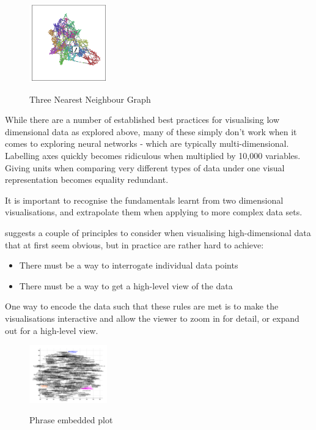 \documentclass[a4paper,11pt,titlepage]{article}
\begin{document}
		 		
 	\begin{figure}[H]
    			\centering	
			{{\includegraphics[width=0.3\textwidth]
    				{img/colah_nearest_neighbour.png} 
    			}}%
    			\caption{Three Nearest Neighbour Graph}%
    		\label{fig:3nn}
	\end{figure}	 	
 		

		While there are a number of established best practices for visualising low dimensional data as explored above, many of these simply don't work when it comes to exploring neural networks - which are typically multi-dimensional. Labelling axes quickly becomes ridiculous when multiplied by 10,000 variables. Giving units when comparing very different types of data under one visual representation becomes equality redundant.
		\par	 
		It is important to recognise the fundamentals learnt from two dimensional visualisations, and extrapolate them when applying to more complex data sets. 
		\par 
		\cite{Olah2014} suggests a couple of principles to consider when visualising high-dimensional data that at first seem obvious, but in practice are rather hard to achieve:
		\begin{itemize}
			\item There must be a way to interrogate individual data points
			\item There must be a way to get a high-level view of the data
		\end{itemize}
		\par 
		One way to encode the data such that these rules are met is to make the visualisations interactive and allow the viewer to zoom in for detail, or expand out for a high-level view. 
		\par 
 		 		
 	\begin{figure}[H]
    			\centering	
			{{\includegraphics[width=0.3\textwidth]
    				{img/word_embeddings_messy.png} 
    			}}%
    			\caption{Phrase embedded plot}%
    		\label{fig:mnistHintonEmbedded}
	\end{figure}
 		
\end{document}
